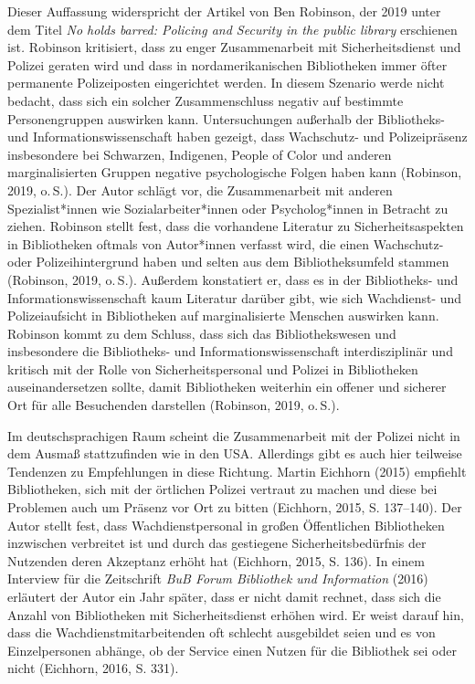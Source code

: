 \documentclass[a4paper,
fontsize=11pt,
oneside,
numbers=noperiodatend,
parskip=half-,
bibliography=totoc,
final
]{scrartcl}
\begin{document}
Dieser Auffassung widerspricht der Artikel von Ben Robinson, der 2019
unter dem Titel \emph{No holds barred: Policing and Security in the
public library} erschienen ist\emph{.} Robinson kritisiert, dass zu
enger Zusammenarbeit mit Sicherheitsdienst und Polizei geraten wird und
dass in nordamerikanischen Bibliotheken immer öfter permanente
Polizeiposten eingerichtet werden. In diesem Szenario werde nicht
bedacht, dass sich ein solcher Zusammenschluss negativ auf bestimmte
Personengruppen auswirken kann. Untersuchungen außerhalb der
Bibliotheks- und Informationswissenschaft haben gezeigt, dass
Wachschutz- und Polizeipräsenz insbesondere bei Schwarzen, Indigenen,
People of Color und anderen marginalisierten Gruppen negative
psychologische Folgen haben kann (Robinson, 2019, o.\,S.). Der Autor
schlägt vor, die Zusammenarbeit mit anderen Spezialist*innen wie
Sozialarbeiter*innen oder Psycholog*innen in Betracht zu ziehen.
Robinson stellt fest, dass die vorhandene Literatur zu
Sicherheitsaspekten in Bibliotheken oftmals von Autor*innen verfasst
wird, die einen Wachschutz- oder Polizeihintergrund haben und selten aus
dem Bibliotheksumfeld stammen (Robinson, 2019, o.\,S.). Außerdem
konstatiert er, dass es in der Bibliotheks- und Informationswissenschaft
kaum Literatur darüber gibt, wie sich Wachdienst- und Polizeiaufsicht in
Bibliotheken auf marginalisierte Menschen auswirken kann. Robinson kommt
zu dem Schluss, dass sich das Bibliothekswesen und insbesondere die
Bibliotheks- und Informationswissenschaft interdisziplinär und kritisch
mit der Rolle von Sicherheitspersonal und Polizei in Bibliotheken
auseinandersetzen sollte, damit Bibliotheken weiterhin ein offener und
sicherer Ort für alle Besuchenden darstellen (Robinson, 2019, o.\,S.).

Im deutschsprachigen Raum scheint die Zusammenarbeit mit der Polizei
nicht in dem Ausmaß stattzufinden wie in den USA. Allerdings gibt es
auch hier teilweise Tendenzen zu Empfehlungen in diese Richtung. Martin
Eichhorn (2015) empfiehlt Bibliotheken, sich mit der örtlichen Polizei
vertraut zu machen und diese bei Problemen auch um Präsenz vor Ort zu
bitten (Eichhorn, 2015, S. 137--140). Der Autor stellt fest, dass
Wachdienstpersonal in großen Öffentlichen Bibliotheken inzwischen
verbreitet ist und durch das gestiegene Sicherheitsbedürfnis der
Nutzenden deren Akzeptanz erhöht hat (Eichhorn, 2015, S. 136). In einem
Interview für die Zeitschrift \emph{BuB Forum Bibliothek und
Information} (2016) erläutert der Autor ein Jahr später, dass er nicht
damit rechnet, dass sich die Anzahl von Bibliotheken mit
Sicherheitsdienst erhöhen wird. Er weist darauf hin, dass die
Wachdienstmitarbeitenden oft schlecht ausgebildet seien und es von
Einzelpersonen abhänge, ob der Service einen Nutzen für die Bibliothek
sei oder nicht (Eichhorn, 2016, S. 331).
\end{document}
